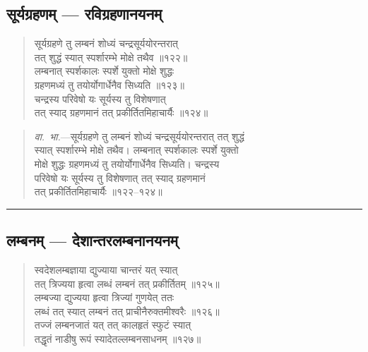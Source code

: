 \documentclass[11pt,a4paper]{article}
\newcommand{\longline}{\noindent\rule{\textwidth}{0.4pt}}
\newcommand{\dev}[1]{{\devanagarifont #1}}
\newenvironment{shloka}{%
  \begin{quote}
  \small
  \setlength{\leftmargin}{2em}
  \devanagarifont
}{\end{quote}}
\newenvironment{vyakhya}{%
  \begin{quote}
  \small
  \setlength{\leftmargin}{1em}
  \devanagarifont
}{\end{quote}}
\newcommand{\skt}[1]{{\devanagarifont #1}}
\begin{document}
\subsection{\dev{सूर्यग्रहणम् — रविग्रहणानयनम्}}

\begin{shloka}
\skt{सूर्यग्रहणे तु लम्बनं शोध्यं चन्द्रसूर्ययोरन्तरात्}\\[0.3em]
\skt{तत् शुद्धं स्यात् स्पर्शारम्भे मोक्षे तथैव ॥१२२॥}\\[0.3em]
\skt{लम्बनात् स्पर्शकालः स्पर्शे युक्तो मोक्षे शुद्धः}\\[0.3em]
\skt{ग्रहणमध्यं तु तयोर्योगार्धेनैव सिध्यति ॥१२३॥}\\[0.3em]
\skt{चन्द्रस्य परिवेषो यः सूर्यस्य तु विशेषणात्}\\[0.3em]
\skt{तत् स्याद् ग्रहणमानं तत् प्रकीर्तितमिहाचार्यैः ॥१२४॥}
\end{shloka}

\begin{vyakhya}
\textit{वा.~भा.}—\skt{सूर्यग्रहणे तु लम्बनं शोध्यं चन्द्रसूर्ययोरन्तरात् तत् शुद्धं}\\
\skt{स्यात् स्पर्शारम्भे मोक्षे तथैव। लम्बनात् स्पर्शकालः स्पर्शे युक्तो}\\
\skt{मोक्षे शुद्धः ग्रहणमध्यं तु तयोर्योगार्धेनैव सिध्यति। चन्द्रस्य}\\
\skt{परिवेषो यः सूर्यस्य तु विशेषणात् तत् स्याद् ग्रहणमानं}\\
\skt{तत् प्रकीर्तितमिहाचार्यैः ॥१२२--१२४॥}
\end{vyakhya}

\longline

\subsection{\dev{लम्बनम् — देशान्तरलम्बनानयनम्}}

\begin{shloka}
\skt{स्वदेशलम्बज्ञाया द्युज्याया चान्तरं यत् स्यात्}\\[0.3em]
\skt{तत् त्रिज्यया हृत्वा लब्धं लम्बनं तत् प्रकीर्तितम् ॥१२५॥}\\[0.3em]
\skt{लम्बज्या द्युज्यया हृत्वा त्रिज्यां गुणयेत् ततः}\\[0.3em]
\skt{लब्धं तत् स्यात् लम्बनं तत् प्राचीनैरुक्तमीश्वरैः ॥१२६॥}\\[0.3em]
\skt{तज्जं लम्बनजातं यत् तत् कालहृतं स्फुटं स्यात्}\\[0.3em]
\skt{तद्धृतं नाडीषु रूपं स्यादेतल्लम्बनसाधनम् ॥१२७॥}
\end{shloka}
\end{document}
